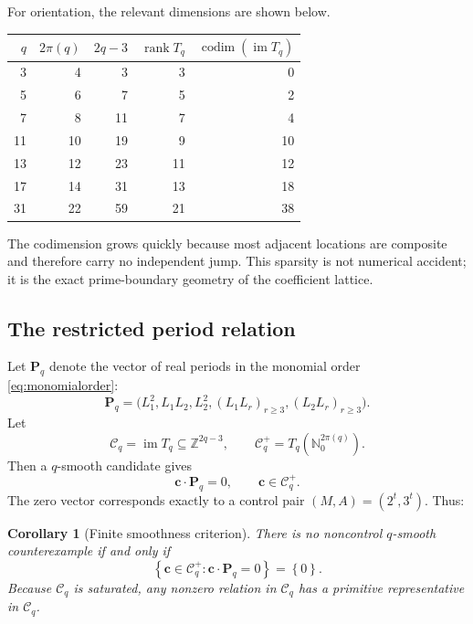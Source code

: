 \documentclass[11pt]{article}
\newtheorem{corollary}[theorem]{Corollary}
\theoremstyle{definition}
\theoremstyle{remark}
\newcommand{\N}{\mathbb N}
\newcommand{\Z}{\mathbb Z}
\newcommand{\rank}{\operatorname{rank}}
\newcommand{\im}{\operatorname{im}}
\newcommand{\cC}{\mathcal C}
\newcommand{\vct}[1]{\bm{#1}}
\newcommand{\set}[1]{\left\{#1\right\}}
\begin{document}
For orientation, the relevant dimensions are shown below.
\begin{center}
\begin{tabular}{rrrrr}
\toprule
$q$ & $2\pi(q)$ & $2q-3$ & $\rank T_q$ & $\operatorname{codim}(\im T_q)$\\
\midrule
3  & 4  & 3  & 3  & 0\\
5  & 6  & 7  & 5  & 2\\
7  & 8  & 11 & 7  & 4\\
11 & 10 & 19 & 9  & 10\\
13 & 12 & 23 & 11 & 12\\
17 & 14 & 31 & 13 & 18\\
31 & 22 & 59 & 21 & 38\\
\bottomrule
\end{tabular}
\end{center}
The codimension grows quickly because most adjacent locations are composite and
therefore carry no independent jump.  This sparsity is not numerical accident;
it is the exact prime-boundary geometry of the coefficient lattice.

\subsection{The restricted period relation}

Let $\vct P_q$ denote the vector of real periods in the monomial order
\eqref{eq:monomialorder}:
\begin{equation}\label{eq:Pq}
 \vct P_q=
 \bigl(L_1^2,L_1L_2,L_2^2,(L_1L_r)_{r\ge3},(L_2L_r)_{r\ge3}\bigr).
\end{equation}
Let
\begin{equation}\label{eq:Cqdef}
 \cC_q=\im T_q\subseteq\Z^{2q-3},
 \qquad
 \cC_q^+=T_q(\N_0^{2\pi(q)}).
\end{equation}
Then a $q$-smooth candidate gives
\begin{equation}\label{eq:Cqrelation}
 \vct c\cdot\vct P_q=0,
 \qquad
 \vct c\in\cC_q^+.
\end{equation}
The zero vector corresponds exactly to a control pair $(M,A)=(2^t,3^t)$.
Thus:

\begin{corollary}[Finite smoothness criterion]\label{cor:smoothcriterion}
There is no noncontrol $q$-smooth counterexample if and only if
\[
 \set{\vct c\in\cC_q^+:\vct c\cdot\vct P_q=0}=\set{0}.
\]
Because $\cC_q$ is saturated, any nonzero relation in $\cC_q$ has a primitive
representative in $\cC_q$.
\end{corollary}
\end{document}
